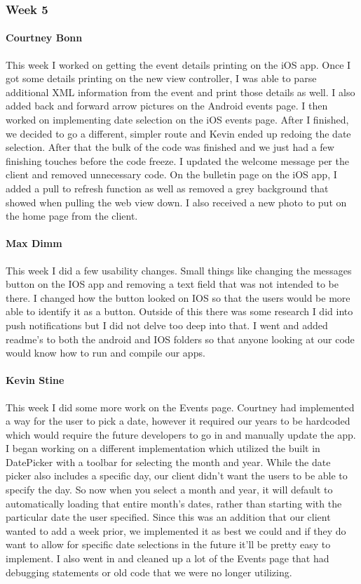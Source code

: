 		\subsubsection{Week 5}

			\paragraph{Courtney Bonn}
			This week I worked on getting the event details printing on the iOS app. Once I got some details printing on the new view controller, I was able to parse additional XML information from the event and print those details as well. I also added back and forward arrow pictures on the Android events page. I then worked on implementing date selection on the iOS events page. After I finished, we decided to go a different, simpler route and Kevin ended up redoing the date selection. After that the bulk of the code was finished and we just had a few finishing touches before the code freeze. I updated the welcome message per the client and removed unnecessary code. On the bulletin page on the iOS app, I added a pull to refresh function as well as removed a grey background that showed when pulling the web view down. I also received a new photo to put on the home page from the client.

			\paragraph{Max Dimm}
			This week I did a few usability changes. Small things like changing the messages button on the IOS app and removing a text field that was not intended to be there. I changed how the button looked on IOS so that the users would be more able to identify it as a button. Outside of this there was some research I did into push notifications but I did not delve too deep into that. I went and added readme's to both the android and IOS folders so that anyone looking at our code would know how to run and compile our apps.

			\paragraph{Kevin Stine}
			This week I did some more work on the Events page. Courtney had implemented a way for the user to pick a date, however it required our years to be hardcoded which would require the future developers to go in and manually update the app. I began working on a different implementation which utilized the built in DatePicker with a toolbar for selecting the month and year. While the date picker also includes a specific day, our client didn't want the users to be able to specify the day. So now when you select a month and year, it will default to automatically loading that entire month's dates, rather than starting with the particular date the user specified. Since this was an addition that our client wanted to add a week prior, we implemented it as best we could and if they do want to allow for specific date selections in the future it'll be pretty easy to implement. I also went in and cleaned up a lot of the Events page that had debugging statements or old code that we were no longer utilizing.

